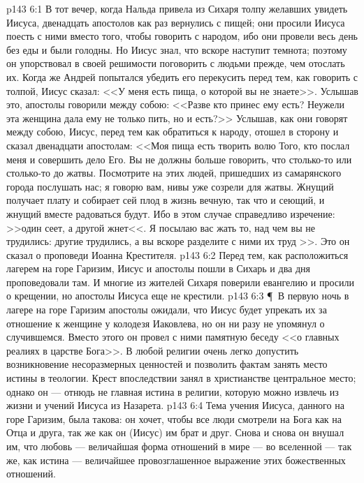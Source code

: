 \vs p143 6:1 В тот вечер, когда Нальда привела из Сихаря толпу желавших увидеть Иисуса, двенадцать апостолов как раз вернулись с пищей; они просили Иисуса поесть с ними вместо того, чтобы говорить с народом, ибо они провели весь день без еды и были голодны. Но Иисус знал, что вскоре наступит темнота; поэтому он упорствовал в своей решимости поговорить с людьми прежде, чем отослать их. Когда же Андрей попытался убедить его перекусить перед тем, как говорить с толпой, Иисус сказал: <<У меня есть пища, о которой вы не знаете>>. Услышав это, апостолы говорили между собою: <<Разве кто принес ему есть? Неужели эта женщина дала ему не только пить, но и есть?>> Услышав, как они говорят между собою, Иисус, перед тем как обратиться к народу, отошел в сторону и сказал двенадцати апостолам: <<Моя пища есть творить волю Того, кто послал меня и совершить дело Его. Вы не должны больше говорить, что столько\hyp{}то или столько\hyp{}то до жатвы. Посмотрите на этих людей, пришедших из самарянского города послушать нас; я говорю вам, нивы уже созрели для жатвы. Жнущий получает плату и собирает сей плод в жизнь вечную, так что и сеющий, и жнущий вместе радоваться будут. Ибо в этом случае справедливо изречение: >>один сеет, а другой жнет<<. Я посылаю вас жать то, над чем вы не трудились: другие трудились, а вы вскоре разделите с ними их труд >>. Это он сказал о проповеди Иоанна Крестителя.
\vs p143 6:2 Перед тем, как расположиться лагерем на горе Гаризим, Иисус и апостолы пошли в Сихарь и два дня проповедовали там. И многие из жителей Сихаря поверили евангелию и просили о крещении, но апостолы Иисуса еще не крестили.
\vs p143 6:3 \P\ В первую ночь в лагере на горе Гаризим апостолы ожидали, что Иисус будет упрекать их за отношение к женщине у колодезя Иаковлева, но он ни разу не упомянул о случившемся. Вместо этого он провел с ними памятную беседу <<о главных реалиях в царстве Бога>>. В любой религии очень легко допустить возникновение несоразмерных ценностей и позволить фактам занять место истины в теологии. Крест впоследствии занял в христианстве центральное место; однако он --- отнюдь не главная истина в религии, которую можно извлечь из жизни и учений Иисуса из Назарета.
\vs p143 6:4 Тема учения Иисуса, данного на горе Гаризим, была такова: он хочет, чтобы все люди смотрели на Бога как на Отца и друга, так же как он (Иисус) им брат и друг. Снова и снова он внушал им, что любовь --- величайшая форма отношений в мире --- во вселенной --- так же, как истина --- величайшее провозглашенное выражение этих божественных отношений.
